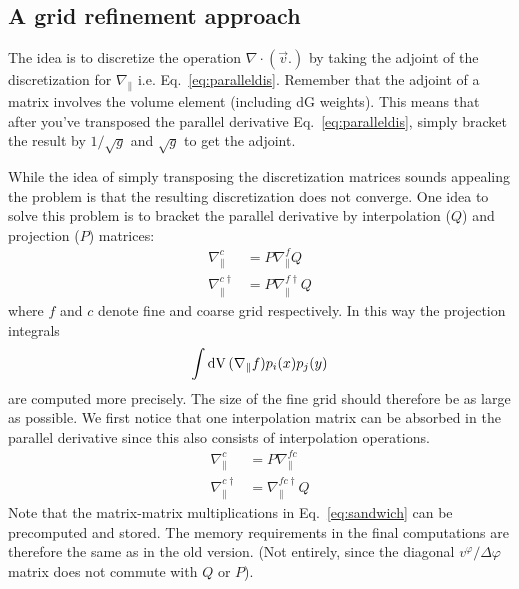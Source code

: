 \subsection{A grid refinement approach}
The idea is to discretize the operation $\nabla\cdot( \vec v .)$ by
taking the adjoint of the discretization for $\nabla_\parallel$ i.e. Eq.~\eqref{eq:paralleldis}.
Remember that the adjoint of a matrix
involves the volume element (including dG weights). This means that after you've transposed the
parallel derivative Eq.~\eqref{eq:paralleldis}, simply bracket the result
by $1/\sqrt{g}$ and $\sqrt{g}$ to get the adjoint.

While the idea of simply transposing the discretization matrices sounds appealing the problem
is that the resulting discretization does not converge.
One idea to solve this problem \cite{Stegmeir2017} is
to bracket the parallel derivative by interpolation ($Q$) and
projection ($P$) matrices:
\begin{align}
    \nabla^c_\parallel &= P\nabla_\parallel^f Q \\
    \nabla^{c\dagger}_\parallel &= P \nabla^{f\dagger}_\parallel Q
    \label{eq:sandwich}
\end{align}
where $f$ and $c$ denote fine and coarse grid respectively.
In this way the projection integrals
\begin{align*}
    \int\mathrm{dV}\, (\nabla_\parallel f) p_i(x)p_j(y)
    \label{}
\end{align*}
are computed more precisely.
The size of the fine grid should therefore be as large as
possible.
We first notice that one interpolation matrix can be absorbed
in the parallel derivative since this also consists of
interpolation operations.
\begin{align}
    \nabla^c_\parallel &= P\nabla_\parallel^{fc} \\
    \nabla^{c\dagger}_\parallel &= \nabla^{fc\dagger}_\parallel Q
    \label{eq:sandwich}
\end{align}
Note that the matrix-matrix multiplications in Eq.~\eqref{eq:sandwich} can
be precomputed and stored. The memory requirements
in the final computations are
therefore the same  as in the old version. (Not entirely, since
the diagonal $v^\varphi/\Delta \varphi$ matrix does not commute with $Q$ or $P$).



